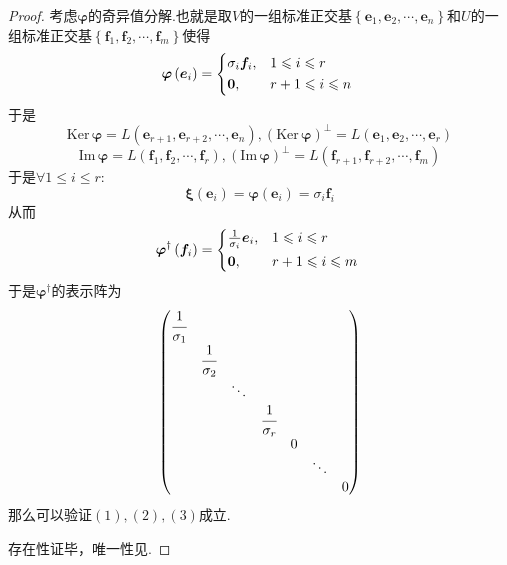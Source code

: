 {\begin{proof}
        考虑$\bm{\varphi}$的奇异值分解.也就是取$V$的一组标准正交基$\left\{
            \bm{e}_1,\bm{e}_2,\cdots,\bm{e}_n
            \right\}$和$U$的一组标准正交基$\left\{
            \bm{f}_1,\bm{f}_2,\cdots,\bm{f}_m
            \right\}$使得\[
            \bm{\varphi}\left(
            \bm{e}_i
            \right)=
            \begin{cases*}
                \sigma_i\bm{f}_i, & $1\leqslant i\leqslant r$   \\
                \bm{0},           & $r+1\leqslant i\leqslant n$
            \end{cases*}
        \]于是\[
            \mathrm{Ker}\,\bm{\varphi}=L\left(
            \bm{e}_{r+1},\bm{e}_{r+2},\cdots,\bm{e}_n
            \right),\left(
            \mathrm{Ker}\,\bm{\varphi}
            \right)^{\perp}=L\left(
            \bm{e}_1,\bm{e}_2,\cdots,\bm{e}_r
            \right)
        \]\[
            \mathrm{Im}\,\bm{\varphi}=L\left(
            \bm{f}_1,\bm{f}_2,\cdots,\bm{f}_r
            \right),\left(
            \mathrm{Im}\,\bm{\varphi}
            \right)^{\perp}=L\left(
            \bm{f}_{r+1},\bm{f}_{r+2},\cdots,\bm{f}_m
            \right)
        \]于是$\forall1\leqslant i\leqslant r:$\[
            \bm{\xi}\left(
            \bm{e}_i
            \right)=\bm{\varphi}\left(
            \bm{e}_i
            \right)=\sigma_i\bm{f}_i
        \]从而\[
            \bm{\varphi}^{\dagger}\left(
            \bm{f}_i
            \right)=\begin{cases*}
                \frac{1}{\sigma_i}\bm{e}_i, & $1\leqslant i\leqslant r$   \\
                \bm{0},                     & $r+1\leqslant i\leqslant m$
            \end{cases*}
        \]于是$\bm{\varphi}^{\dagger}$的表示阵为\[
            \begin{pmatrix}
                \cfrac{1}{\sigma_1} &                     &        &                     &   &        &   \\
                                    & \cfrac{1}{\sigma_2} &        &                     &   &        &   \\
                                    &                     & \ddots &                     &   &        &   \\
                                    &                     &        & \cfrac{1}{\sigma_r} &   &        &   \\
                                    &                     &        &                     & 0 &        &   \\
                                    &                     &        &                     &   & \ddots &   \\
                                    &                     &        &                     &   &        & 0
            \end{pmatrix}
        \]那么可以验证$(1),(2),(3)$成立.

        存在性证毕，唯一性见\cite{torsor3}.
    \end{proof}
}
